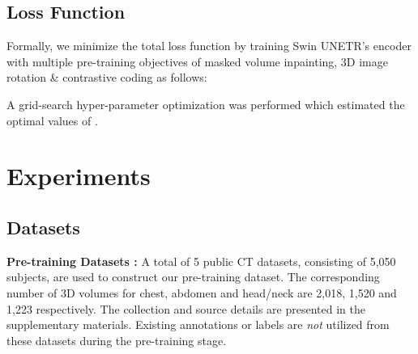 \documentclass[10pt,twocolumn,letterpaper]{article}
\begin{document}
\subsection{Loss Function}
Formally, we minimize the total loss function by training Swin UNETR's encoder with multiple pre-training objectives of masked volume inpainting, 3D image rotation \& contrastive coding as follows:

A grid-search hyper-parameter optimization was performed which estimated the optimal values of .












    







\section{Experiments}
\subsection{Datasets}
\textbf{Pre-training Datasets :} A total of 5 public CT datasets, consisting of 5,050 subjects, are used to construct our pre-training dataset. The corresponding  number of 3D volumes for chest, abdomen and head/neck are 2,018, 1,520 and 1,223 respectively. The collection and source details are presented in the supplementary materials. Existing annotations or labels are \textit{not} utilized from these datasets during the pre-training stage.
\end{document}
